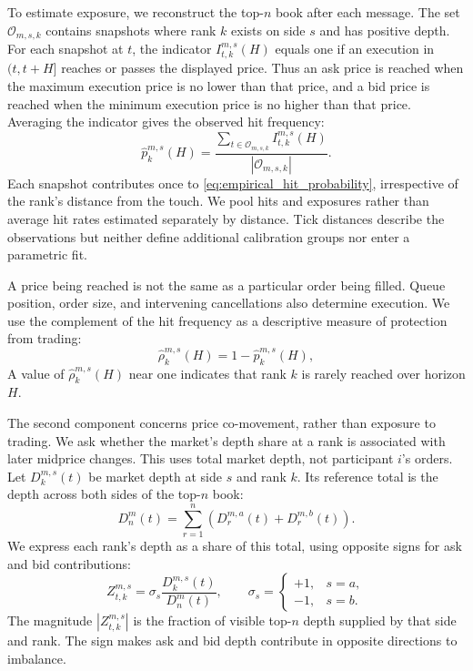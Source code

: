 \documentclass[11pt]{article}
\begin{document}
To estimate exposure, we reconstruct the top-$n$ book after each message. The set $\mathcal{O}_{m,s,k}$ contains snapshots where rank $k$ exists on side $s$ and has positive depth. For each snapshot at $t$, the indicator $I^{m,s}_{t,k}(H)$ equals one if an execution in $(t,t+H]$ reaches or passes the displayed price. Thus an ask price is reached when the maximum execution price is no lower than that price, and a bid price is reached when the minimum execution price is no higher than that price. Averaging the indicator gives the observed hit frequency:
\begin{equation}
    \widehat p^{m,s}_{k}(H)
    =
    \frac{
        \sum_{t\in\mathcal{O}_{m,s,k}}I^{m,s}_{t,k}(H)
    }{
        |\mathcal{O}_{m,s,k}|
    }.
    \label{eq:empirical_hit_probability}
\end{equation}
Each snapshot contributes once to \cref{eq:empirical_hit_probability}, irrespective of the rank's distance from the touch.
We pool hits and exposures rather than average hit rates estimated separately by distance. Tick distances describe the
observations but neither define additional calibration groups nor enter a parametric fit.

A price being reached is not the same as a particular order being filled. Queue position, order size, and intervening cancellations also determine execution. We use the complement of the hit frequency as a descriptive measure of protection from trading:
\begin{equation}
    \widehat\rho^{m,s}_{k}(H)=1-\widehat p^{m,s}_{k}(H),
    \label{eq:empirical_protection_profile}
\end{equation}
A value of $\widehat\rho^{m,s}_{k}(H)$ near one indicates that rank $k$ is rarely reached over horizon $H$.

The second component concerns price co-movement, rather than exposure to trading. We ask whether the market's depth share at a rank is associated with later midprice changes. This uses total market depth, not participant $i$'s orders. Let $D^{m,s}_{k}(t)$ be market depth at side $s$ and rank $k$. Its reference total is the depth across both sides of the top-$n$ book:
\begin{equation}
    D^{m}_{n}(t)
    =
    \sum_{r=1}^{n}\left(D^{m,a}_{r}(t)+D^{m,b}_{r}(t)\right).
    \label{eq:total_topn_market_depth}
\end{equation}
We express each rank's depth as a share of this total, using opposite signs for ask and bid contributions:
\begin{equation}
    Z^{m,s}_{t,k}
    =
    \sigma_s\frac{D^{m,s}_{k}(t)}{D^{m}_{n}(t)},
    \qquad
    \sigma_s= \begin{cases}
        +1, & s=a,\\
        -1, & s=b.
    \end{cases}
    \label{eq:normalized_level_contribution}
\end{equation}
The magnitude $|Z^{m,s}_{t,k}|$ is the fraction of visible top-$n$ depth supplied by that side and rank. The sign makes ask
and bid depth contribute in opposite directions to imbalance.
\end{document}
